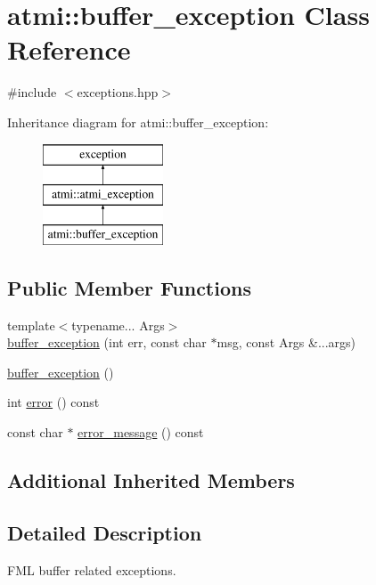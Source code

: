 \hypertarget{classatmi_1_1buffer__exception}{}\section{atmi\+:\+:buffer\+\_\+exception Class Reference}
\label{classatmi_1_1buffer__exception}


{\ttfamily \#include $<$exceptions.\+hpp$>$}

Inheritance diagram for atmi\+:\+:buffer\+\_\+exception\+:\begin{figure}[H]
\begin{center}
\leavevmode
\includegraphics[height=3.000000cm]{classatmi_1_1buffer__exception}
\end{center}
\end{figure}
\subsection*{Public Member Functions}
\begin{DoxyCompactItemize}
\item 
{\footnotesize template$<$typename... Args$>$ }\\\hyperlink{classatmi_1_1buffer__exception_aff48a3528d8a2d575a194233f454bd40}{buffer\+\_\+exception} (int err, const char $\ast$msg, const Args \&...args)
\item 
\hyperlink{classatmi_1_1buffer__exception_a25ef1cb87d75bfca1577f298466e77a0}{buffer\+\_\+exception} ()
\item 
int \hyperlink{classatmi_1_1buffer__exception_a8d9475dbaa7d9864b906dc6ea9818351}{error} () const 
\item 
const char $\ast$ \hyperlink{classatmi_1_1buffer__exception_a6881332c2a607fb71b987eaf811723b7}{error\+\_\+message} () const 
\end{DoxyCompactItemize}
\subsection*{Additional Inherited Members}


\subsection{Detailed Description}
F\+ML buffer related exceptions. 

